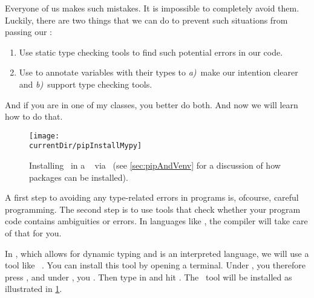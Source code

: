 Everyone of us makes such mistakes.
It is impossible to completely avoid them.
Luckily, there are two things that we can do to prevent such situations from passing our :%
%
\begin{enumerate}%
%
\item Use static type checking tools to find such potential errors in our code.%
%
\item Use  to annotate variables with their types to \emph{a)}~make our intention clearer and \emph{b)}~support type checking tools.%
%
\end{enumerate}%
%
And if you are in one of my classes, you better do both.
And now we will learn how to do that.%
\endhsection%
%
%
%
%
\begin{figure}%
\centering%
\texttt{[image: \\currentDir/pipInstallMypy]}%
\caption{Installing \mypy\ in a \ubuntu\  via \pip~(see \cref{sec:pipAndVenv} for a discussion of how packages can be installed).}%
\label{fig:pipInstallMypy}%
\end{figure}%
%
%
%
%
%
%
%
A first step to avoiding any type-related errors in programs is, ofcourse, careful programming.
The second step is to use tools that check whether your program code contains ambiguities or errors.
In languages like , the compiler will take care of that for you.

In \python, which allows for dynamic typing and is an interpreted language, we will use a tool like \mypy~\cite{LLHSVRZSJYYMC2024MOSTFP}.
You can install this tool by opening a terminal.
Under \ubuntu, you therefore press \ubuntuTerminal, and under \microsoftWindows, you \windowsTerminal.
Then type in  and hit \keys{\enter}.
The \mypy\ tool will be installed as illustrated in \cref{fig:pipInstallMypy}.

